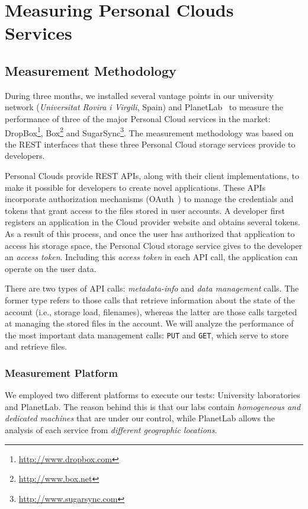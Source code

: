 \chapter{Measuring Personal Clouds Services}

\section{Measurement Methodology}
During three months, we installed several
vantage points in our university network (\textit{Universitat
Rovira i Virgili}, Spain) and PlanetLab~\cite{planetlab}  
to measure the performance of three of the major Personal Cloud services in the market: DropBox\footnote{\url{http://www.dropbox.com}}, Box\footnote{\url{http://www.box.net}} 
and SugarSync\footnote{\url{http://www.sugarsync.com}}. The measurement methodology was based on the REST interfaces that these three Personal Cloud storage services provide to developers.

Personal Clouds provide REST APIs, along with
their client implementations, to make it possible for developers to
create novel applications. These APIs incorporate authorization
mechanisms (OAuth~\cite{oauth}) to manage the credentials and tokens
that grant access to the files stored in user accounts. A
developer first registers an application 
in the Cloud provider website and obtains several tokens.
As a result of this process, and once the user has authorized
that application to access his storage space, the Personal Cloud storage service
gives to the developer an \textit{access token}. Including this \textit{access token} in each API call, the application can operate on the user data.

There are two types of API calls: \textit{metadata-info} and
\textit{data management} calls. The former type refers to
those calls that retrieve information about the state of the
account (i.e., storage load, filenames), whereas the latter
are those calls targeted at managing the stored files
in the account. %
We will analyze the performance
of the most important data management calls: \texttt{PUT} and \texttt{GET},
which serve to store and retrieve files.  


\subsection{Measurement Platform} 

We employed two different platforms
to execute our tests: University laboratories and PlanetLab.
The reason behind this is that our labs contain
\textit{homogeneous and dedicated machines} that are under our control,
while PlanetLab allows the analysis of each service from \textit{different geographic locations}. 

